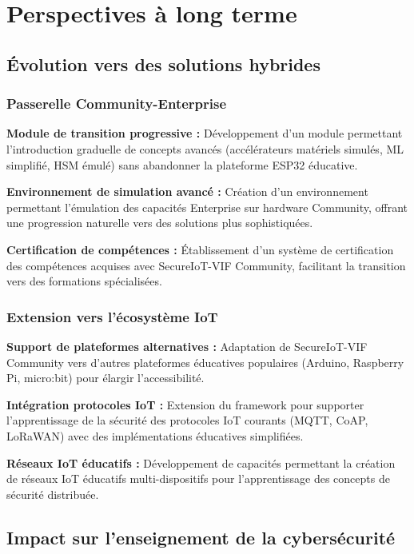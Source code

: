 \section{Perspectives à long terme}

\subsection{Évolution vers des solutions hybrides}

\subsubsection{Passerelle Community-Enterprise}

\textbf{Module de transition progressive :} Développement d'un module permettant l'introduction graduelle de concepts avancés (accélérateurs matériels simulés, ML simplifié, HSM émulé) sans abandonner la plateforme ESP32 éducative.

\textbf{Environnement de simulation avancé :} Création d'un environnement permettant l'émulation des capacités Enterprise sur hardware Community, offrant une progression naturelle vers des solutions plus sophistiquées.

\textbf{Certification de compétences :} Établissement d'un système de certification des compétences acquises avec SecureIoT-VIF Community, facilitant la transition vers des formations spécialisées.

\subsubsection{Extension vers l'écosystème IoT}

\textbf{Support de plateformes alternatives :} Adaptation de SecureIoT-VIF Community vers d'autres plateformes éducatives populaires (Arduino, Raspberry Pi, micro:bit) pour élargir l'accessibilité.

\textbf{Intégration protocoles IoT :} Extension du framework pour supporter l'apprentissage de la sécurité des protocoles IoT courants (MQTT, CoAP, LoRaWAN) avec des implémentations éducatives simplifiées.

\textbf{Réseaux IoT éducatifs :} Développement de capacités permettant la création de réseaux IoT éducatifs multi-dispositifs pour l'apprentissage des concepts de sécurité distribuée.

\subsection{Impact sur l'enseignement de la cybersécurité}

